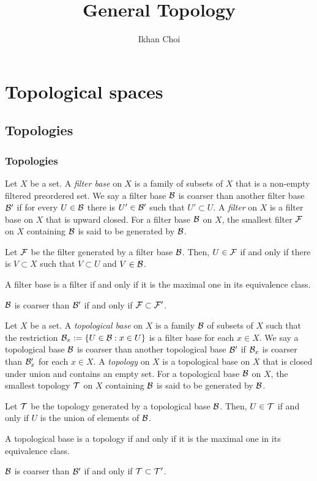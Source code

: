 \documentclass{../../large}
\begin{document}
\title{General Topology}
\author{Ikhan Choi}
\maketitle
\tableofcontents

\part{Topological spaces}


\chapter{Topologies}

\section{Topologies}

\begin{prb}[Filters]
Let $X$ be a set.
A \emph{filter base} on $X$ is a family of subsets of $X$ that is a non-empty filtered preordered set.
We say a filter base $\mathcal{B}$ is coarser than another filter base $\mathcal{B}'$ if for every $U\in\mathcal{B}$ there is $U'\in\mathcal{B}'$ such that $U'\subset U$.
A \emph{filter} on $X$ is a filter base on $X$ that is upward closed.
For a filter base $\mathcal{B}$ on $X$, the smallest filter $\mathcal{F}$ on $X$ containing $\mathcal{B}$ is said to be generated by $\mathcal{B}$.
\begin{parts}
\item Let $\mathcal{F}$ be the filter generated by a filter base $\mathcal{B}$. Then, $U\in\mathcal{F}$ if and only if there is $V\subset X$ such that $V\subset U$ and $V\in\mathcal{B}$.
\item A filter base is a filter if and only if it is the maximal one in its equivalence class.
\item $\mathcal{B}$ is coarser than $\mathcal{B}'$ if and only if $\mathcal{F}\subset\mathcal{F}'$.
\end{parts}
\end{prb}

\begin{prb}[Topologies]
Let $X$ be a set.
A \emph{topological base} on $X$ is a family $\mathcal{B}$ of subsets of $X$ such that the restriction $\mathcal{B}_x:=\{U\in\mathcal{B}:x\in U\}$ is a filter base for each $x\in X$.
We say a topological base $\mathcal{B}$ is coarser than another topological base $\mathcal{B}'$ if $\mathcal{B}_x$ is coarser than $\mathcal{B}'_x$ for each $x\in X$.
A \emph{topology} on $X$ is a topological base on $X$ that is closed under union and contains an empty set.
For a topological base $\mathcal{B}$ on $X$, the smallest topology $\mathcal{T}$ on $X$ containing $\mathcal{B}$ is said to be generated by $\mathcal{B}$.
\begin{parts}
\item Let $\mathcal{T}$ be the topology generated by a topological base $\mathcal{B}$. Then, $U\in\mathcal{T}$ if and only if $U$ is the union of elements of $\mathcal{B}$.
\item A topological base is a topology if and only if it is the maximal one in its equivalence class.
\item $\mathcal{B}$ is coarser than $\mathcal{B}'$ if and only if $\mathcal{T}\subset\mathcal{T}'$.
\end{parts}
\end{prb}
\end{document}
